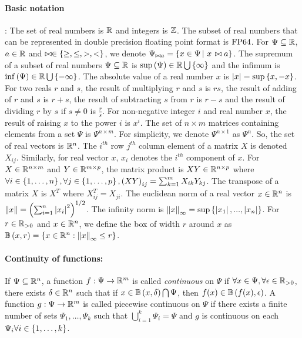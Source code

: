 \paragraph{Basic notation}:  The set of real numbers is $\mathbb{R}$
and integers is $\mathbb{Z}$.  The subset of real
numbers that can be represented in double precision floating point
format is $\operatorname{FP64}$.  For $\Psi\subseteq\mathbb{R}$, $a\in\mathbb{R}$
and $\bowtie\in\left\{\geq,\leq,>,<\right\}$, we denote $\Psi_{\bowtie a}
= \left\{ x\in\Psi \left|~x\right. \bowtie a \right\}$.  The supremum of a subset of real
numbers $\Psi\subseteq\mathbb{R}$ is
$\sup\left(\Psi\right)\in\mathbb{R}\bigcup\left\{\infty\right\}$ and the infimum is
$\inf\left(\Psi\right)\in\mathbb{R}\bigcup\left\{-\infty\right\}$.  The absolute value of a
real number $x$ is $\left|x\right| = \sup\left\{x,-x\right\}$.  For two reals $r$ and
$s$, the result of multiplying $r$ and $s$ is $rs$, the result of
adding of $r$ and $s$ is $r+s$, the result of subtracting $s$ from $r$
is $r-s$ and the result of dividing $r$ by $s$ if $s\neq 0$ is
$\frac{r}{s}$.  For non-negative integer $i$ and real number $x$, the
result of raising $x$ to the power $i$ is $x^i$.  The set of $n\times
m$ matrices containing elements from a set $\Psi$ is $\Psi^{n\times
m}$.  For simplicity, we denote $\Psi^{n\times 1}$ as $\Psi^n$.  So,
the set of real vectors is $\mathbb{R}^n$. The $i^{th}$ row $j^{th}$
column element of a matrix $X$ is denoted $X_{ij}$.  Similarly, for
real vector $x$, $x_i$ denotes the $i^{th}$ component of $x$.  For
$X\in\mathbb{R}^{n\times m}$ and $Y\in\mathbb{R}^{m\times p}$, the matrix
product is $XY\in\mathbb{R}^{n\times p}$ where $\forall
i\in\left\{1,\ldots,n\right\},\forall j\in\left\{1,\ldots,p\right\},\left(XY\right)_{ij}
= \sum_{k=1}^{m}X_{ik}Y_{kj}$.  The transpose of a matrix $X$ is $X^T$
where $X^T_{ij} = X_{ji}$.  The euclidean norm of a real vector
$x\in\mathbb{R}^n$ is $\left\|x\right\| = \left(\sum_{i=1}^n\left|x_i\right|^2\right)^{1/2}$.
The infinity norm is $\left\|x\right\|_\infty
= \sup\left\{\left|x_1\right|,...,\left|x_n\right|\right\}$.  For $r\in\mathbb{R}_{> 0}$ and
$x\in\mathbb{R}^n$, we define the box of width $r$ around $x$ as
$\mathbb{B}\left(x,r\right) = \left\{ x\in\mathbb{R}^n: \left\|x\right\|_\infty \leq r \right\}$.
%
\paragraph{Continuity of functions:} If $\Psi\subseteq\mathbb{R}^n$, a
function $f:\Psi\rightarrow\mathbb{R}^m$ is called \emph{continuous} on
$\Psi$ if $\forall x\in\Psi,\forall\epsilon\in\mathbb{R}_{>0}$, there
exists $\delta\in\mathbb{R}^n$ such that if
$x\in\mathbb{B}\left(x,\delta\right)\bigcap\Psi$, then
$f(x)\in\mathbb{B}\left(f(x),\epsilon\right)$.  A function
$g:\Psi\rightarrow\mathbb{R}^m$ is called piecewise continuous on $\Psi$
if there exists a finite number of sets $\Psi_1,\ldots,\Psi_k$ such
that $\bigcup_{i=1}^k\Psi_i=\Psi$ and $g$ is continuous on each
$\Psi_i\forall i\in\left\{1,\ldots,k\right\}$.
%
